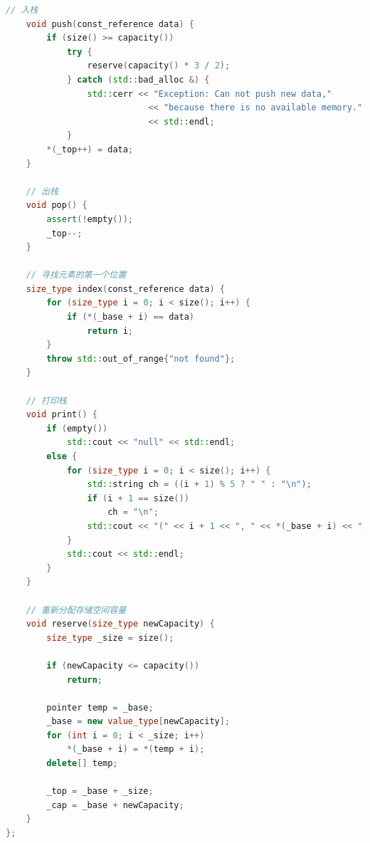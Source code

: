 \documentclass{ctexart}
\begin{document}
\begin{lstlisting}[language=C++,caption=Stack类的实现,label=code3]
    // 入栈
    void push(const_reference data) {
        if (size() >= capacity())
            try {
                reserve(capacity() * 3 / 2);
            } catch (std::bad_alloc &) {
                std::cerr << "Exception: Can not push new data,"
                            << "because there is no available memory."
                            << std::endl;
            }
        *(_top++) = data;
    }

    // 出栈
    void pop() {
        assert(!empty());
        _top--;
    }

    // 寻找元素的第一个位置
    size_type index(const_reference data) {
        for (size_type i = 0; i < size(); i++) {
            if (*(_base + i) == data)
                return i;
        }
        throw std::out_of_range{"not found"};
    }

    // 打印栈
    void print() {
        if (empty())
            std::cout << "null" << std::endl;
        else {
            for (size_type i = 0; i < size(); i++) {
                std::string ch = ((i + 1) % 5 ? " " : "\n");
                if (i + 1 == size())
                    ch = "\n";
                std::cout << "(" << i + 1 << ", " << *(_base + i) << ")" << ch;
            }
            std::cout << std::endl;
        }
    }

    // 重新分配存储空间容量
    void reserve(size_type newCapacity) {
        size_type _size = size();

        if (newCapacity <= capacity())
            return;

        pointer temp = _base;
        _base = new value_type[newCapacity];
        for (int i = 0; i < _size; i++)
            *(_base + i) = *(temp + i);
        delete[] temp;

        _top = _base + _size;
        _cap = _base + newCapacity;
    }
};
\end{lstlisting}
\end{document}
